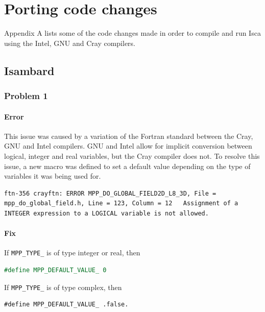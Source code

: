\documentclass[a4paper,11pt]{report}
\begin{document}



%
\newpage
{}
\printbibliography
%

\appendix
\chapter{Porting code changes}
\label{apdx:porting}
Appendix A lists some of the code changes made in order to compile and run Isca using the Intel, GNU and Cray compilers. 
\section*{Isambard}
\subsection*{Problem 1}
\subsubsection*{Error}
This issue was caused by a variation of the Fortran standard between the Cray, GNU and Intel compilers. GNU and Intel allow for implicit conversion between logical, integer and real variables, but the Cray compiler does not. To resolve this issue, a new macro was defined to set a default value depending on the type of variables it was being used for. 
\begin{lstlisting}
ftn-356 crayftn: ERROR MPP_DO_GLOBAL_FIELD2D_L8_3D, File = mpp_do_global_field.h, Line = 123, Column = 12   Assignment of a INTEGER expression to a LOGICAL variable is not allowed.
\end{lstlisting}

\subsubsection*{Fix}
If \texttt{MPP\_TYPE\_} is of type integer or real, then 
\begin{lstlisting}[language=Fortran]
#define MPP_DEFAULT_VALUE_ 0
\end{lstlisting}
\par
If \texttt{MPP\_TYPE\_} is of type complex, then 
\begin{lstlisting}
#define MPP_DEFAULT_VALUE_ .false.
\end{lstlisting}
\end{document}
